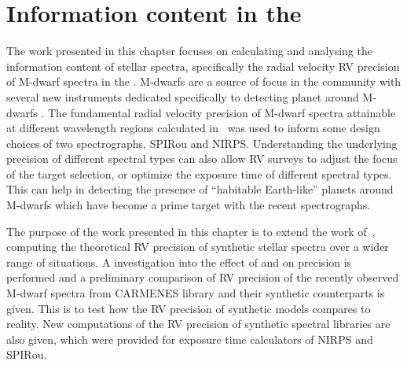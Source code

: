 
\chapter{Information content in the \nir{}}
\label{cha:nir_content}

The work presented in this chapter focuses on calculating and analysing the information content of stellar spectra, specifically the radial velocity {RV} precision of M-dwarf spectra in the \nir{}. 
M-dwarfs are a source of focus in the community with several new instruments dedicated specifically to detecting planet around M-dwarfs \citep[e.g.][among others]{quirrenbach_carmenes_2014, bouchy_nearinfrared_2017, artigau_spirou_2014}.
The fundamental radial velocity precision of {M-dwarf} spectra attainable at different wavelength regions calculated in~\citet{figueira_radial_2016} was used to inform some design choices of two \nir{} spectrographs, {SPIRou} and {NIRPS}.
Understanding the underlying precision of different spectral types can also allow {RV} surveys to adjust the focus of the target selection, or optimize the exposure time of different spectral types.
This can help in detecting the presence of ``habitable Earth-like'' planets around {M-dwarfs} which have become a prime target with the recent \nir{} spectrographs.

The purpose of the work presented in this chapter is to extend the work of~\citet{figueira_radial_2016}, computing the theoretical {RV} precision of synthetic stellar spectra over a wider range of situations.
A investigation into the effect of \Logg{} and \feh{} on precision is performed and a preliminary comparison of {RV} precision of the recently observed \nir{} {M-dwarf} spectra from {CARMENES} library and their synthetic counterparts is given.
This is to test how the {RV} precision of synthetic models compares to reality.
New computations of the {RV} precision of synthetic spectral libraries are also given, which were provided for exposure time calculators of {NIRPS} and {SPIRou}.


